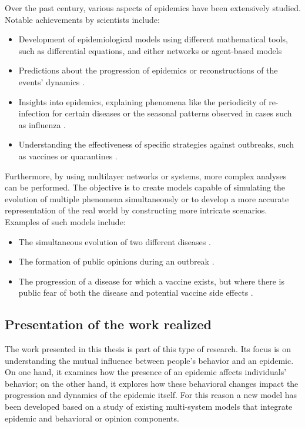Over the past century, various aspects of epidemics have been extensively studied. Notable achievements by scientists include:
\begin{itemize}
	\item Development of epidemiological models using different mathematical tools, such as differential equations, and either networks or agent-based models
	\item Predictions about the progression of epidemics or reconstructions of the events' dynamics \cite{diekmann2000mathematical, brauer2012mathematical, Ledder_2023}.
	\item Insights into epidemics, explaining phenomena like the periodicity of re-infection for certain diseases or the seasonal patterns observed in cases such as influenza \cite{Bjoernstad2016}.
	\item Understanding the effectiveness of specific strategies against outbreaks, such as vaccines or quarantines \cite{Wang_2015_review}.
\end{itemize}
Furthermore, by using multilayer networks or systems, more complex analyses can be performed. The objective is to create models capable of simulating the evolution of multiple phenomena simultaneously or to develop a more accurate representation of the real world by constructing more intricate scenarios. Examples of such models include:
\begin{itemize}
	\item The simultaneous evolution of two different diseases \cite{DeDomenico2016}.
	\item The formation of public opinions during an outbreak \cite{teslya2022}.
	\item The progression of a disease for which a vaccine exists, but where there is public fear of both the disease and potential vaccine side effects \cite{Epstein_2021}.
\end{itemize}

\subsection{Presentation of the work realized}
The work presented in this thesis is part of this type of research. Its focus is on understanding the mutual influence between people's behavior and an epidemic. On one hand, it examines how the presence of an epidemic affects individuals' behavior; on the other hand, it explores how these behavioral changes impact the progression and dynamics of the epidemic itself. 
For this reason a new model has been developed based on a study of existing multi-system models that integrate epidemic and behavioral or opinion components.

